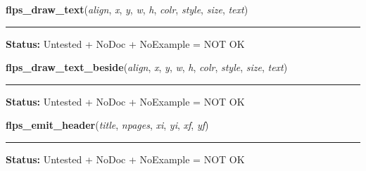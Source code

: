    \vspace{0.5ex}

\hspace{.8\funcindent}\begin{boxedminipage}{\funcwidth}

    \raggedright \textbf{flps\_draw\_text}(\textit{align}, \textit{x}, \textit{y}, \textit{w}, \textit{h}, \textit{colr}, \textit{style}, \textit{size}, \textit{text})

    \vspace{-1.5ex}

    \rule{\textwidth}{0.5\fboxrule}
\setlength{\parskip}{2ex}
\setlength{\parskip}{1ex}
\textbf{Status:} Untested + NoDoc + NoExample = NOT OK



    \end{boxedminipage}

    \label{xformslib:library:flps_draw_text_beside}

    \vspace{0.5ex}

\hspace{.8\funcindent}\begin{boxedminipage}{\funcwidth}

    \raggedright \textbf{flps\_draw\_text\_beside}(\textit{align}, \textit{x}, \textit{y}, \textit{w}, \textit{h}, \textit{colr}, \textit{style}, \textit{size}, \textit{text})

    \vspace{-1.5ex}

    \rule{\textwidth}{0.5\fboxrule}
\setlength{\parskip}{2ex}
\setlength{\parskip}{1ex}
\textbf{Status:} Untested + NoDoc + NoExample = NOT OK



    \end{boxedminipage}

    \label{xformslib:library:flps_emit_header}

    \vspace{0.5ex}

\hspace{.8\funcindent}\begin{boxedminipage}{\funcwidth}

    \raggedright \textbf{flps\_emit\_header}(\textit{title}, \textit{npages}, \textit{xi}, \textit{yi}, \textit{xf}, \textit{yf})

    \vspace{-1.5ex}

    \rule{\textwidth}{0.5\fboxrule}
\setlength{\parskip}{2ex}
\setlength{\parskip}{1ex}
\textbf{Status:} Untested + NoDoc + NoExample = NOT OK



    \end{boxedminipage}


